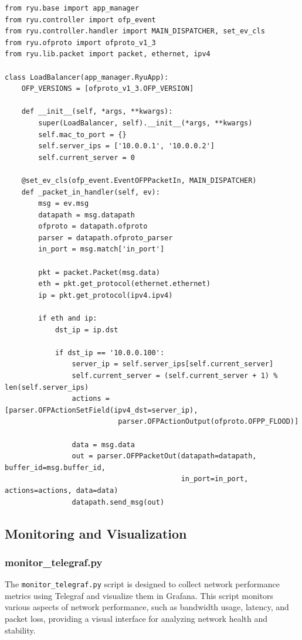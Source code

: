 \documentclass[a4paper,12pt]{article}
\begin{document}
\begin{verbatim}
from ryu.base import app_manager
from ryu.controller import ofp_event
from ryu.controller.handler import MAIN_DISPATCHER, set_ev_cls
from ryu.ofproto import ofproto_v1_3
from ryu.lib.packet import packet, ethernet, ipv4

class LoadBalancer(app_manager.RyuApp):
    OFP_VERSIONS = [ofproto_v1_3.OFP_VERSION]

    def __init__(self, *args, **kwargs):
        super(LoadBalancer, self).__init__(*args, **kwargs)
        self.mac_to_port = {}
        self.server_ips = ['10.0.0.1', '10.0.0.2']
        self.current_server = 0

    @set_ev_cls(ofp_event.EventOFPPacketIn, MAIN_DISPATCHER)
    def _packet_in_handler(self, ev):
        msg = ev.msg
        datapath = msg.datapath
        ofproto = datapath.ofproto
        parser = datapath.ofproto_parser
        in_port = msg.match['in_port']

        pkt = packet.Packet(msg.data)
        eth = pkt.get_protocol(ethernet.ethernet)
        ip = pkt.get_protocol(ipv4.ipv4)

        if eth and ip:
            dst_ip = ip.dst

            if dst_ip == '10.0.0.100':
                server_ip = self.server_ips[self.current_server]
                self.current_server = (self.current_server + 1) % len(self.server_ips)
                actions = [parser.OFPActionSetField(ipv4_dst=server_ip),
                           parser.OFPActionOutput(ofproto.OFPP_FLOOD)]

                data = msg.data
                out = parser.OFPPacketOut(datapath=datapath, buffer_id=msg.buffer_id,
                                          in_port=in_port, actions=actions, data=data)
                datapath.send_msg(out)
\end{verbatim}

\subsection{Monitoring and Visualization}

\subsubsection{monitor\_telegraf.py}
The \texttt{monitor\_telegraf.py} script is designed to collect network performance metrics using Telegraf and visualize them in Grafana. This script monitors various aspects of network performance, such as bandwidth usage, latency, and packet loss, providing a visual interface for analyzing network health and stability.
\end{document}
